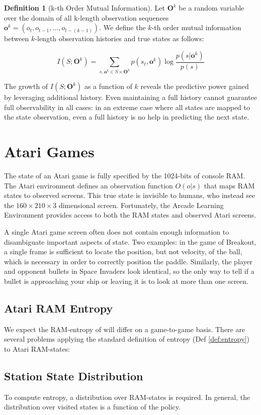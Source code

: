 \documentclass{article} %
\theoremstyle{definition}
\newtheorem{definition}{Definition}[section]
\begin{document}
\begin{definition}[k-th Order Mutual Information]
Let $\textbf{O}^k$ be a random variable over the domain of all
k-length observation sequences $\textbf{o}^k = (o_t, o_{t-1}, \dots,
o_{t-(k-1)})$. We define the $k$-th order mutual information between
$k$-length observation histories and true states as follows:

\[
I(S;\textbf{O}^k) = \sum_{s,\textbf{o}^k \in S \times \textbf{O}^k} p(s_t,\textbf{o}^k) \log \frac{p(s|\textbf{o}^k)}{p(s)}
\]
\end{definition}

The growth of $I(S;\textbf{O}^k)$ as a function of $k$ reveals the
predictive power gained by leveraging additional history. Even
maintaining a full history cannot guarantee full observability in all
cases: in an extreme case where all states are mapped to the state
observation, even a full history is no help in predicting the next
state.

\section{Atari Games}
The state of an Atari game is fully specified by the 1024-bits of
console RAM. The Atari environment defines an observation function
$O(o|s)$ that maps RAM states to observed screens. This true state is
invisible to humans, who instead see the $160 \times 210 \times 3$
dimensional screen. Fortunately, the Arcade Learning Environment
provides access to both the RAM states and observed Atari screens.

A single Atari game screen often does not contain enough information
to disambiguate important aspects of state. Two examples: in the game
of Breakout, a single frame is sufficient to locate the position, but
not velocity, of the ball, which is necessary in order to correctly
position the paddle. Similarly, the player and opponent bullets in
Space Invaders look identical, so the only way to tell if a bullet is
approaching your ship or leaving it is to look at more than one
screen.

\subsection{Atari RAM Entropy}
We expect the RAM-entropy of will differ on a game-to-game
basis. There are several problems applying the standard definition of
entropy (Def \ref{def:entropy}) to Atari RAM-states:

\subsection{Station State Distribution}
To compute entropy, a distribution over RAM-states is required. In
general, the distribution over visited states is a function of the
policy.
\end{document}
